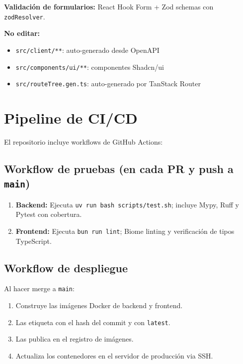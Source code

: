 \textbf{Validación de formularios:} React Hook Form + Zod schemas con \texttt{zodResolver}.

\textbf{No editar:}

\begin{itemize}
\tightlist
\item
  \texttt{src/client/**}: auto-generado desde OpenAPI
\item
  \texttt{src/components/ui/**}: componentes Shadcn/ui
\item
  \texttt{src/routeTree.gen.ts}: auto-generado por TanStack Router
\end{itemize}

\section{Pipeline de CI/CD}\label{pipeline-de-cicd}

El repositorio incluye workflows de GitHub Actions:

\subsection{\texorpdfstring{Workflow de pruebas (en cada PR y push a \texttt{main})}{Workflow de pruebas (en cada PR y push a main)}}\label{workflow-de-pruebas-en-cada-pr-y-push-a-main}

\begin{enumerate}
\def\labelenumi{\arabic{enumi}.}
\tightlist
\item
  \textbf{Backend:} Ejecuta \texttt{uv\ run\ bash\ scripts/test.sh}; incluye Mypy, Ruff y Pytest con cobertura.
\item
  \textbf{Frontend:} Ejecuta \texttt{bun\ run\ lint}; Biome linting y verificación de tipos TypeScript.
\end{enumerate}

\subsection{Workflow de despliegue}\label{workflow-de-despliegue}

Al hacer merge a \texttt{main}:

\begin{enumerate}
\def\labelenumi{\arabic{enumi}.}
\tightlist
\item
  Construye las imágenes Docker de backend y frontend.
\item
  Las etiqueta con el hash del commit y con \texttt{latest}.
\item
  Las publica en el registro de imágenes.
\item
  Actualiza los contenedores en el servidor de producción via SSH.
\end{enumerate}

